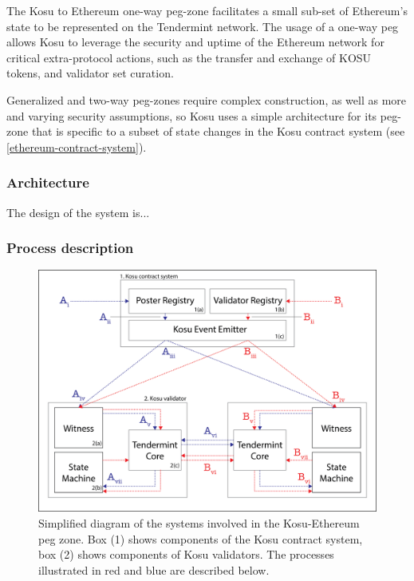 \documentclass[10pt]{article}
\begin{document}
The Kosu to Ethereum one-way peg-zone facilitates a small sub-set of Ethereum's state to be represented on the Tendermint network. The usage of a one-way peg allows Kosu to leverage the security and uptime of the Ethereum network for critical extra-protocol actions, such as the transfer and exchange of KOSU tokens, and validator set curation.
\medskip

Generalized and two-way peg-zones require complex construction, as well as more and varying security assumptions, so Kosu uses a simple architecture for its peg-zone that is specific to a subset of state changes in the Kosu contract system (see \ref{ethereum-contract-system}).

\subsubsection{Architecture}\label{peg-architecture}
The design of the system is...

\subsubsection{Process description}\label{peg-process}
\begin{figure}[H]
  \centering
  \includegraphics[width=\textwidth]{../figures/fig1.png}
  \caption{Simplified diagram of the systems involved in the Kosu-Ethereum peg zone. Box (1) shows components of the Kosu contract system, box (2) shows components of Kosu validators. The processes illustrated in red and blue are described below.}
  \label{fig:fig2}
\end{figure}
\end{document}
